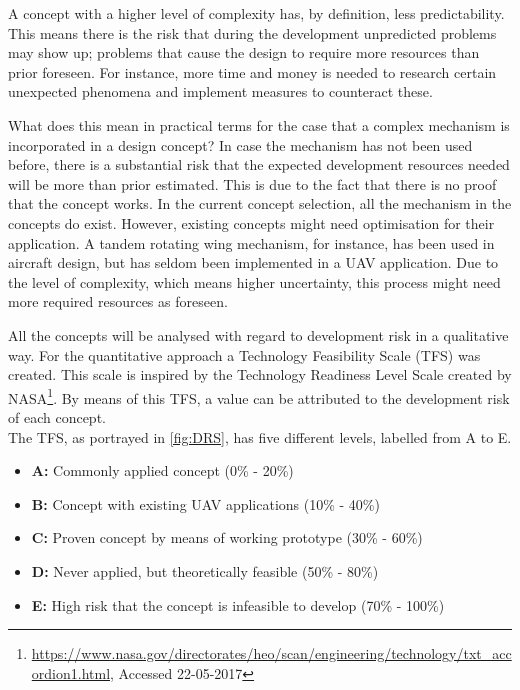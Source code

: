 A concept with a higher level of complexity has, by definition, less predictability. This means there is the risk that during the development unpredicted problems may show up; problems that cause the design to require more resources than prior foreseen. For instance, more time and money is needed to research certain unexpected phenomena and implement measures to counteract these.

What does this mean in practical terms for the case that a complex mechanism is incorporated in a design concept? In case the mechanism has not been used before, there is a substantial risk that the expected development resources needed will be more than prior estimated. This is due to the fact that there is no proof that the concept works. In the current concept selection, all the mechanism in the concepts do exist.  However, existing concepts might need optimisation for their application. A tandem rotating wing mechanism, for instance, has been used in aircraft design, but has seldom been implemented in a UAV application. Due to the level of complexity, which means higher uncertainty, this process might need more required resources as foreseen.

All the concepts will be analysed with regard to development risk in a qualitative way. For the quantitative approach a Technology Feasibility Scale (TFS) was created. This scale is inspired by the Technology Readiness Level Scale created by NASA\footnote{\url{https://www.nasa.gov/directorates/heo/scan/engineering/technology/txt_accordion1.html}, Accessed 22-05-2017}. By means of this TFS, a value can be attributed to the development risk of each concept.\\

\noindent The TFS, as portrayed in \autoref{fig:DRS}, has five different levels, labelled from A to E.

\begin{itemize}
    \item \textbf{A:} Commonly applied concept (0\% - 20\%)
    \item \textbf{B:} Concept with existing UAV applications (10\% - 40\%)
    \item \textbf{C:} Proven concept by means of working prototype (30\% - 60\%)
    \item \textbf{D:} Never applied, but theoretically feasible (50\% - 80\%)
    \item \textbf{E:} High risk that the concept is infeasible to develop (70\% - 100\%)
\end{itemize}

